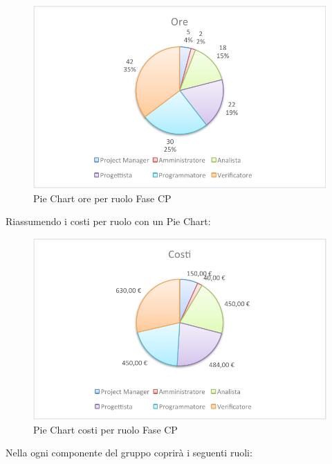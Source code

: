 				\begin{figure}[H]\centering
					\includegraphics[width=\textwidth]{PianoDiProgetto/Pics/ChartTotOreFaseCP.pdf}
					\caption{Pie Chart ore per ruolo Fase CP}
				\end{figure}
				Riassumendo i costi per ruolo con un Pie Chart:
				\begin{figure}[H]\centering
					\includegraphics[width=\textwidth]{PianoDiProgetto/Pics/ChartTotCostiFaseCP.pdf}
					\caption{Pie Chart costi per ruolo Fase CP}
				\end{figure}
				Nella  ogni componente del gruppo \groupname{} coprirà i seguenti ruoli:
